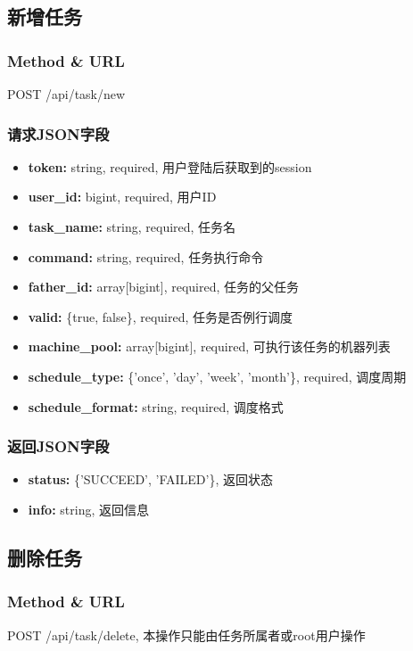 ﻿\documentclass[a4paper]{report}
\begin{document}
\subsection{新增任务}
\subsubsection{Method \& URL} %
POST /api/task/new 

\subsubsection{请求JSON字段}
\begin{itemize}
	\item \textbf{token:} string, required, 用户登陆后获取到的session
	\item \textbf{user\_id:} bigint, required, 用户ID
	\item \textbf{task\_name:} string, required, 任务名
	\item \textbf{command:} string, required, 任务执行命令
	\item \textbf{father\_id:} array[bigint], required, 任务的父任务
	\item \textbf{valid:} \{true, false\}, required, 任务是否例行调度
	\item \textbf{machine\_pool:} array[bigint], required, 可执行该任务的机器列表
	\item \textbf{schedule\_type:} \{'once', 'day', 'week', 'month'\}, required, 调度周期
	\item \textbf{schedule\_format:} string, required, 调度格式
\end{itemize}

\subsubsection{返回JSON字段}
\begin{itemize}
	\item \textbf{status:} \{'SUCCEED', 'FAILED'\}, 返回状态
	\item \textbf{info:} string, 返回信息
\end{itemize}


\subsection{删除任务} %
\subsubsection{Method \& URL} %
POST /api/task/delete, 本操作只能由任务所属者或root用户操作
\end{document}
